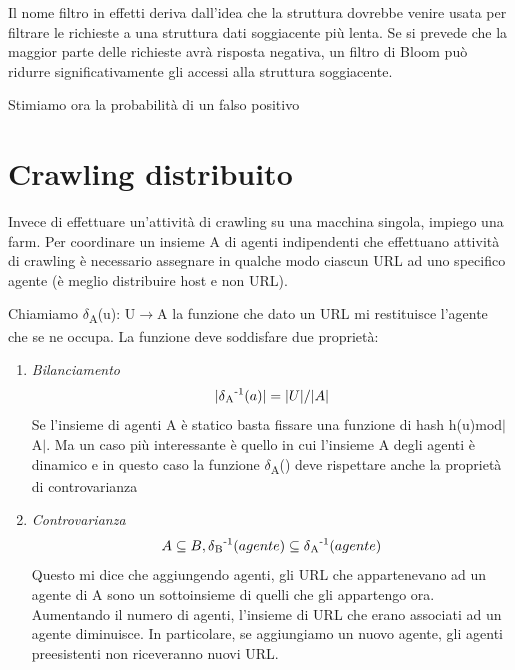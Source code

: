 \documentclass[12pt,italian]{report}
\begin{document}
Il nome filtro in effetti deriva dall'idea che la struttura dovrebbe venire usata per filtrare le richieste a una struttura dati soggiacente più lenta. Se si prevede che la maggior parte delle richieste avrà risposta negativa, un filtro di Bloom può ridurre significativamente gli accessi alla struttura soggiacente. 

Stimiamo ora la probabilità di un falso positivo

\clearpage

\section{Crawling distribuito}
\label{Crawling distribuito}
Invece di effettuare un'attività di crawling su una macchina singola, impiego una farm. Per coordinare un insieme A di agenti indipendenti che effettuano attività di crawling è necessario assegnare in qualche modo ciascun URL ad uno specifico agente (è meglio distribuire host e non URL). 

Chiamiamo $\delta$\textsubscript{A}(u): U$\xrightarrow{}$A la funzione che dato un URL mi restituisce l'agente che se ne occupa. La funzione deve soddisfare due proprietà:

\begin{enumerate}
    \item \textit{Bilanciamento}
     \begin{equation}
      |\delta\textsubscript{A}\textsuperscript{-1}(a)| = |U|/|A|
     \end{equation}
     Se l'insieme di agenti A è statico basta fissare una funzione di hash h(u)mod$|$A$|$. Ma un caso più interessante è quello in cui l'insieme A degli agenti è dinamico e in questo caso la funzione $\delta$\textsubscript{A}() deve rispettare anche la proprietà di controvarianza
     
    \item \textit{Controvarianza}
    \begin{equation}
         A\subseteq B, 
         \delta\textsubscript{B}\textsuperscript{-1}(agente)\subseteq \delta\textsubscript{A}\textsuperscript{-1}(agente) 
    \end{equation}
    Questo mi dice che aggiungendo agenti, gli URL che appartenevano ad un agente di A sono un sottoinsieme di quelli che gli appartengo ora. Aumentando il numero di agenti, l'insieme di URL che erano associati ad un agente diminuisce. In particolare, se aggiungiamo un nuovo agente, gli agenti preesistenti non riceveranno nuovi URL.
\end{enumerate}
    
\end{document}
